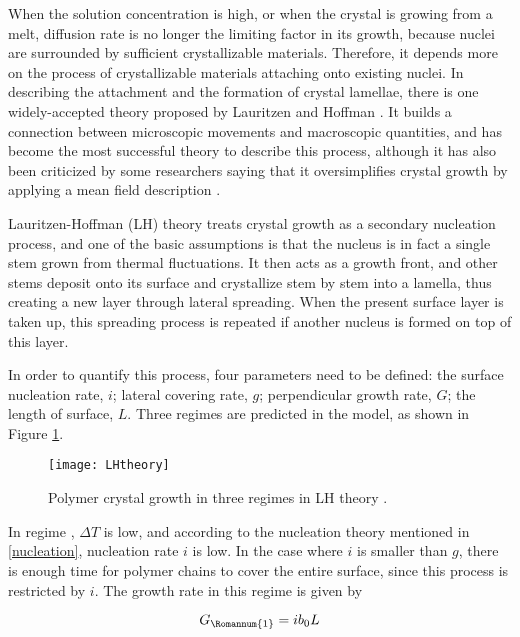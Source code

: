 When the solution concentration is high, or when the crystal is growing from a melt, diffusion rate is no longer the limiting factor in its growth, because nuclei are surrounded by sufficient crystallizable materials. Therefore, it depends more on the process of crystallizable materials attaching onto existing nuclei. In describing the attachment and the formation of crystal lamellae, there is one widely-accepted theory proposed by Lauritzen and Hoffman \cite{Lauritzen,Hoffman,Lauritzen1973}. It builds a connection between microscopic movements and macroscopic quantities, and has become the most successful theory to describe this process, although it has also been criticized by some researchers saying that it oversimplifies crystal growth by applying a mean field description \cite{Zhang2016a}.

Lauritzen-Hoffman (LH) theory treats crystal growth as a secondary nucleation process, and one of the basic assumptions is that the nucleus is in fact a single stem grown from thermal fluctuations. It then acts as a growth front, and other stems deposit onto its surface and crystallize stem by stem into a lamella, thus creating a new layer through lateral spreading. When the present surface layer is taken up, this spreading process is repeated if another nucleus is formed on top of this layer.

In order to quantify this process, four parameters need to be defined: the surface nucleation rate, $i$; lateral covering rate, $g$; perpendicular growth rate, $G$; the length of surface, $L$. Three regimes are predicted in the model, as shown in Figure \ref{fig:LH theory}.

\begin{figure}[H]
\center
\texttt{[image: LHtheory]}
\caption[Polymer crystal growth in three regimes in LH theory.]{Polymer crystal growth in three regimes in LH theory \cite{Cheng2005}.}
\label{fig:LH theory}
\end{figure}

In regime , $\Delta T$ is low, and according to the nucleation theory \cite{Turnbull1949} mentioned in \ref{nucleation}, nucleation rate $i$ is low. In the case where $i$ is smaller than $g$, there is enough time for polymer chains to cover the entire surface, since this process is restricted by $i$. The growth rate in this regime is given by

\begin{equation}
\label{eqn_regime1}
G_{\Romannum{1}} = i b_{0} L
\end{equation}

